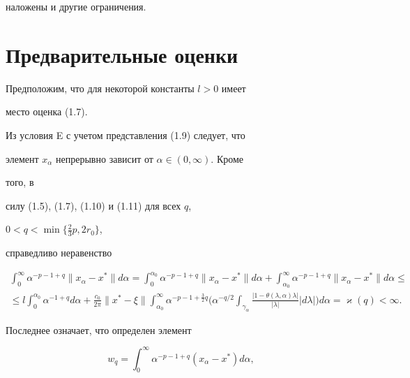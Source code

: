 наложены и другие ограничения.





\section{Предварительные оценки}





Предположим, что для некоторой константы $l>0$ имеет 


место оценка (1.7).





Из условия E с учетом представления (1.9) следует, что 


элемент $x_\alpha$ непрерывно зависит от $\alpha\in(0,\infty)$. Кроме 


того, в 


силу (1.5), (1.7), (1.10) и (1.11) для всех $q$, 


$0<q<\min\{\frac{2}{3}p,2r_0\}$,


справедливо неравенство


\begin{multline}


\int^\infty_0 \alpha^{-p-1+q}\|x_\alpha-x^*\|d\alpha=


\int^{\alpha_0}_0 \alpha^{-p-1+q}\|x_\alpha-x^*\|d\alpha+


\int^\infty_{\alpha_0}\alpha^{-p-1+q}\|x_\alpha-x^*\|d\alpha\le \\


%


\le l\int^{\alpha_0}_0 \alpha^{-1+q}d\alpha+\frac{c_0}{2\pi}


\|x^*-\xi\|\int^\infty_{\alpha_0}\alpha^{-p-1+\frac{3}{2}q}


\bigg(\alpha^{-q/2}\int_{\gamma_\alpha}


\frac{|1-\theta(\lambda,\alpha)\lambda|}{|\lambda|}


|d\lambda|\bigg)d\alpha= 


\varkappa(q)<\infty.


\end{multline}


Последнее означает, что определен элемент


\begin{equation}


w_q=\int^\infty_0 \alpha^{-p-1+q}(x_\alpha-x^*)d\alpha,


\end{equation}


